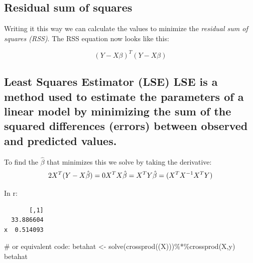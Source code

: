 \documentclass[
  letterpaper,
  DIV=11,
  numbers=noendperiod]{scrartcl}
\newenvironment{Shaded}{\begin{snugshade}}{\end{snugshade}}
\newcommand{\CommentTok}[1]{\textcolor[rgb]{0.37,0.37,0.37}{#1}}
\newcommand{\DecValTok}[1]{\textcolor[rgb]{0.68,0.00,0.00}{#1}}
\newcommand{\FunctionTok}[1]{\textcolor[rgb]{0.28,0.35,0.67}{#1}}
\newcommand{\NormalTok}[1]{\textcolor[rgb]{0.00,0.23,0.31}{#1}}
\newcommand{\OtherTok}[1]{\textcolor[rgb]{0.00,0.23,0.31}{#1}}
\newcommand{\SpecialCharTok}[1]{\textcolor[rgb]{0.37,0.37,0.37}{#1}}
\begin{document}
\subsection{Residual sum of squares}\label{residual-sum-of-squares}

Writing it this way we can calculate the values to minimize the
\emph{residual sum of squares (RSS)}. The RSS equation now looks like
this:

\[
(Y - X\beta)^T(Y - X\beta)
\]

\subsection{Least Squares Estimator (LSE) LSE is a method used to
estimate the parameters of a linear model by minimizing the sum of the
squared differences (errors) between observed and predicted
values.}\label{least-squares-estimator-lse-lse-is-a-method-used-to-estimate-the-parameters-of-a-linear-model-by-minimizing-the-sum-of-the-squared-differences-errors-between-observed-and-predicted-values.}

To find the \(\hat{\beta}\) that minimizes this we solve by taking the
derivative: \[
2X^T(Y-X\hat{\beta})=0\\
X^TX\hat{\beta}=X^TY\\
\hat{\beta}= (X^TX^{-1}X^TY)
\]

In r:

\begin{Shaded}
\end{Shaded}

\begin{verbatim}
       [,1]
  33.886604
x  0.514093
\end{verbatim}

\begin{Shaded}
\begin{Highlighting}[]
\CommentTok{\# or equivalent code:}
\NormalTok{betahat }\OtherTok{\textless{}{-}} \FunctionTok{solve}\NormalTok{(}\FunctionTok{crossprod}\NormalTok{((X)))}\SpecialCharTok{\%*\%}\FunctionTok{crossprod}\NormalTok{(X,y)}
\NormalTok{betahat}
\end{Highlighting}
\end{Shaded}
\end{document}
